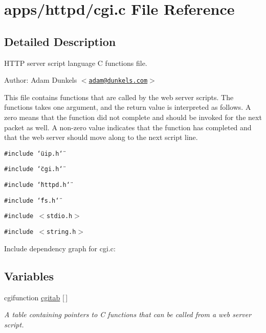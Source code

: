 \hypertarget{a00033}{
\section{apps/httpd/cgi.c File Reference}
\label{a00033}
}


\subsection{Detailed Description}
HTTP server script language C functions file. 

\begin{Desc}
\item[Author:]Adam Dunkels $<$\href{mailto:adam@dunkels.com}{\tt adam@dunkels.com}$>$\end{Desc}
This file contains functions that are called by the web server scripts. The functions takes one argument, and the return value is interpreted as follows. A zero means that the function did not complete and should be invoked for the next packet as well. A non-zero value indicates that the function has completed and that the web server should move along to the next script line. 

{\tt \#include \char`\"{}uip.h\char`\"{}}\par
{\tt \#include \char`\"{}cgi.h\char`\"{}}\par
{\tt \#include \char`\"{}httpd.h\char`\"{}}\par
{\tt \#include \char`\"{}fs.h\char`\"{}}\par
{\tt \#include $<$stdio.h$>$}\par
{\tt \#include $<$string.h$>$}\par


Include dependency graph for cgi.c:\subsection*{Variables}
\begin{CompactItemize}
\item 
\hypertarget{a00082_g04d2c4d8d3c35856348c04fa245a9bb3}{
cgifunction \hyperlink{a00082_g04d2c4d8d3c35856348c04fa245a9bb3}{cgitab} \mbox{[}$\,$\mbox{]}}
\label{a00082_g04d2c4d8d3c35856348c04fa245a9bb3}

\begin{CompactList}\small\item\em A table containing pointers to C functions that can be called from a web server script. \item\end{CompactList}\end{CompactItemize}
